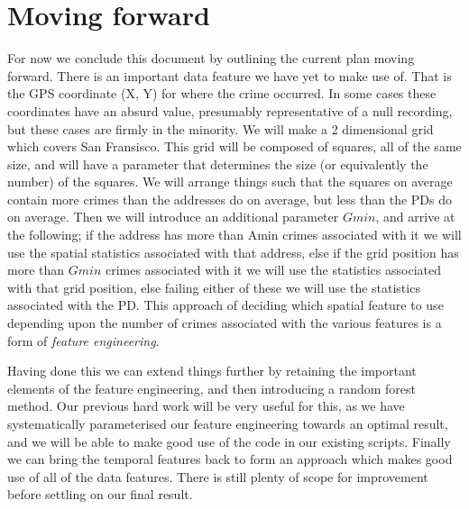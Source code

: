 \documentclass[12pt,notitlepage]{article}
\begin{document}
\section{Moving forward}

For now we conclude this document by outlining the current plan moving forward. There is an important data feature we have yet to make use of. That is the GPS coordinate (X, Y) for where the crime occurred. In some cases these coordinates have an absurd value, presumably representative of a null recording, but these cases are firmly in the minority. We will make a 2 dimensional grid which covers San Fransisco. This grid will be composed of squares, all of the same size, and will have a parameter that determines the size (or equivalently the number) of the squares. We will arrange things such that the squares on average contain more crimes than the addresses do on average, but less than the PDs do on average. Then we will introduce an additional parameter $Gmin$, and arrive at the following; if the address has more than Amin crimes associated with it we will use the spatial statistics associated with that address, else if the grid position has more than $Gmin$ crimes associated with it we will use the statistics associated with that grid position, else failing either of these we will use the statistics associated with the PD. This approach of deciding which spatial feature to use depending upon the number of crimes associated with the various features is a form of \emph{feature engineering}. 

Having done this we can extend things further by retaining the important elements of the feature engineering, and then introducing a random forest method. Our previous hard work will be very useful for this, as we have systematically parameterised our feature engineering towards an optimal result, and we will be able to make good use of the code in our existing scripts. Finally we can bring the temporal features back to form an approach which makes good use of all of the data features. There is still plenty of scope for improvement before settling on our final result.


\end{document}
